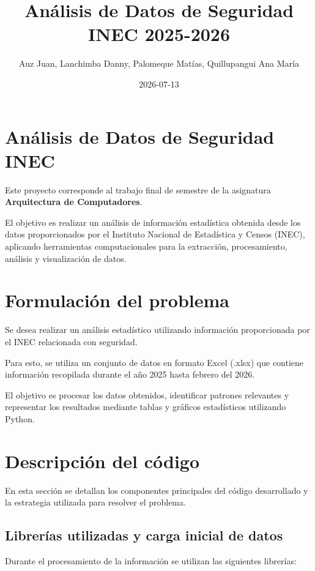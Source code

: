 \documentclass[11pt]{article}
\author{Auz Juan, Lanchimba Danny, Palomeque Matías, Quillupangui Ana María}
\date{2026-07-13}
\title{Análisis de Datos de Seguridad INEC 2025-2026}
\begin{document}
\maketitle
\tableofcontents


\section{Análisis de Datos de Seguridad INEC}
\label{sec:orgf050cd8}

Este proyecto corresponde al trabajo final de semestre de la asignatura
\textbf{\textbf{Arquitectura de Computadores}}.

El objetivo es realizar un análisis de información estadística obtenida
desde los datos proporcionados por el Instituto Nacional de Estadística
y Censos (INEC), aplicando herramientas computacionales para la
extracción, procesamiento, análisis y visualización de datos.

\section{Formulación del problema}
\label{sec:orgb5669be}

Se desea realizar un análisis estadístico utilizando información
proporcionada por el INEC relacionada con seguridad.

Para esto, se utiliza un conjunto de datos en formato Excel (.xlsx) que contiene
información recopilada durante el año 2025 hasta febrero del 2026.

El objetivo es procesar los datos obtenidos, identificar patrones
relevantes y representar los resultados mediante tablas y gráficos
estadísticos utilizando Python.


\section{Descripción del código}
\label{sec:org1e6bbed}

En esta sección se detallan los componentes principales del código
desarrollado y la estrategia utilizada para resolver el problema.


\subsection{Librerías utilizadas y carga inicial de datos}
\label{sec:orgf410425}

Durante el procesamiento de la información se utilizan las siguientes
librerías:
\end{document}
